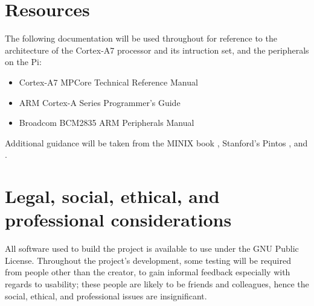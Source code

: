 \documentclass[10pt,a4paper]{article}
\begin{document}
\section*{Resources}
The following documentation will be used throughout for reference to the
architecture of the Cortex-A7 processor and its intruction set, and the
peripherals on the Pi:
\begin{itemize}
    \item Cortex-A7 MPCore Technical Reference Manual
    \item ARM Cortex-A Series Programmer's Guide
    \item Broadcom BCM2835 ARM Peripherals Manual
\end{itemize}

Additional guidance will be taken from the MINIX book \cite{MINIX}, Stanford's
Pintos \cite{Pintos}, and \cite{jsandler}.

\section*{Legal, social, ethical, and professional  considerations}
All software used to build the project is available to use under the GNU Public
License. Throughout the project's development, some testing will be required
from people other than the creator, to gain informal feedback especially with
regards to usability; these people are likely to be friends and colleagues,
hence the social, ethical, and professional issues are insignificant.


\end{document}
